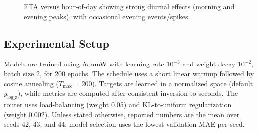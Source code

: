 \begin{figure}[t]
    \centering
    \caption{ETA versus hour-of-day showing strong diurnal effects (morning and evening peaks), with occasional evening events/spikes.}
    \label{fig:eta-per-hour}
\end{figure}

\subsection{Experimental Setup}
Models are trained using AdamW with learning rate $10^{-3}$ and weight decay $10^{-2}$, batch size 2, for 200 epochs. The schedule uses a short linear warmup followed by cosine annealing ($T_{\text{max}}{=}200$). Targets are learned in a normalized space (default $y_{\text{log\_z}}$), while metrics are computed after consistent inversion to seconds. The router uses load-balancing (weight 0.05) and KL-to-uniform regularization (weight 0.002). Unless stated otherwise, reported numbers are the mean over seeds 42, 43, and 44; model selection uses the lowest validation MAE per seed.

